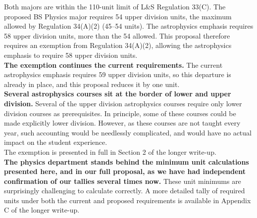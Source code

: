 \documentclass[12pt]{article}
\begin{document}
\noindent
Both majors are within the 110-unit limit of L\&S Regulation 33(C).
The proposed BS Physics major requires 54 upper division units, the
maximum allowed by Regulation 34(A)(2) (45--54 units).  The
astrophysics emphasis requires 58 upper division units, more than the
54 allowed.  This proposal therefore requires an exemption from
Regulation 34(A)(2), allowing the astrophysics emphasis to require 58
upper division units.\\[5pt]

\noindent
{\bf The exemption continues the current requirements.}  The current
astrophysics emphasis requires 59 upper division units, so this
departure is already in place, and this proposal reduces it by one
unit.\\[5pt]

\noindent
{\bf Several astrophysics courses sit at the border of lower and upper
  division.}  Several of the upper division astrophysics courses
require only lower division courses as prerequisites.  In principle,
some of these courses could be made explicitly lower division.
However, as these courses are not taught every year, such accounting
would be needlessly complicated, and would have no actual impact on
the student experience.\\[5pt]

\noindent
The exemption is presented in full in Section 2 of the longer write-up.\\[5pt]

\noindent
{\bf The physics department stands behind the minimum unit
  calculations presented here, and in our full proposal, as we have
  had independent confirmation of our tallies several times now.}
These unit minimums are surprisingly challenging to calculate
correctly.  A more detailed tally of required units under both the
current and proposed requirements is available in Appendix C of the
longer write-up.
\end{document}

